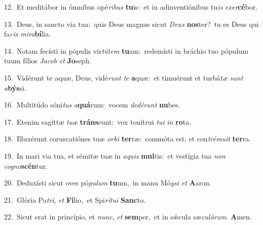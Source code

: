 {\numbfont\textcolor{\numbcolor}{12.}}~Et meditábor in ómnibus opé\-\textit{ri}\-\textit{bus} \textbf{tu}\-is:~\star et in adinventiónibus tu\textit{is} \textit{ex}\-\textit{er}\textbf{cé}bor.\par
{\numbfont\textcolor{\numbcolor}{13.}}~Deus, in sancto via tua:~\dagger quis Deus magnus sicut \textit{De}\-\textit{us} \textbf{nos}\-ter?~\star tu es Deus qui fa\textit{cis} \textit{mi}\-\textit{ra}\textbf{bí}lia.\par
{\numbfont\textcolor{\numbcolor}{14.}}~Notam fecísti in pópulis vir\-\textit{tú}\-\textit{tem} \textbf{tu}\-am:~\star redemísti in bráchio tuo pópulum tuum fílios \textit{Ja}\-\textit{cob} \textit{et} \textbf{Jo}\-seph.\par
{\numbfont\textcolor{\numbcolor}{15.}}~Vidérunt te aquæ, Deus, vidé\textit{runt} \textit{te} \textbf{a}\-quæ:~\star et timuérunt et turbá\textit{tæ} \textit{sunt} \textit{a}\-\textbf{býs}si.\par
{\numbfont\textcolor{\numbcolor}{16.}}~Multitúdo sóni\textit{tus} \textit{a}\-\textbf{quá}rum:~\star vocem \textit{de}\-\textit{dé}\textit{runt} \textbf{nu}\-bes.\par
{\numbfont\textcolor{\numbcolor}{17.}}~Etenim sagíttæ \textit{tu}\-\textit{æ} \textbf{tráns}\-eunt:~\star vox tonítrui \textit{tu}\-\textit{i} \textit{in} \textbf{ro}\-ta.\par
{\numbfont\textcolor{\numbcolor}{18.}}~Illuxérunt coruscatiónes tuæ \textit{or}\-\textit{bi} \textbf{ter}\-ræ:~\star commóta est, et con\-\textit{tré}\-\textit{mu}\textit{it} \textbf{ter}\-ra.\par
{\numbfont\textcolor{\numbcolor}{19.}}~In mari via tua, et sémitæ tuæ in \textit{a}\-\textit{quis} \textbf{mul}\-tis:~\star et vestígia tua \textit{non} \textit{co}\-\textit{gno}\textbf{scén}tur.\par
{\numbfont\textcolor{\numbcolor}{20.}}~Deduxísti sicut oves pó\-\textit{pu}\-\textit{lum} \textbf{tu}\-um,~\star in manu Mó\-\textit{y}\-\textit{si} \textit{et} \textbf{A}\-aron.\par
{\numbfont\textcolor{\numbcolor}{21.}}~Glória Pa\-\textit{tri}\-, \textit{et} \textbf{Fí}\-lio,~\star et Spi\-\textit{rí}\-\textit{tu}\textit{i} \textbf{Sanc}\-to.\par
{\numbfont\textcolor{\numbcolor}{22.}}~Sicut erat in princípio, et \textit{nunc}\-, \textit{et} \textbf{sem}\-per,~\star et in sǽcula sæ\-\textit{cu}\-\textit{ló}\textit{rum}. \textbf{A}\-men.\par
